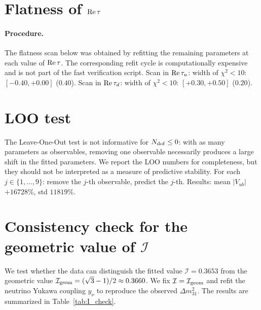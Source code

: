 \documentclass[12pt,a4paper]{article}
\numberwithin{equation}{section}
\begin{document}
\section{Flatness of \({\rm Re}\,\tau\)}
\paragraph{Procedure.}
The flatness scan below was obtained by refitting the remaining parameters at each value of \({\rm Re}\,\tau\). The corresponding refit cycle is computationally expensive and is not part of the fast verification script.
Scan in \({\rm Re}\,\tau_u\): width of \(\chi^2<10\): \([-0.40, +0.00]\) (\(0.40\)). Scan in \({\rm Re}\,\tau_d\): width of \(\chi^2<10\): \([+0.30, +0.50]\) (\(0.20\)).

\section{LOO test}
The Leave-One-Out test is not informative for \(N_{\rm dof} \le 0\): with as many parameters as observables, removing one observable necessarily produces a large shift in the fitted parameters. We report the LOO numbers for completeness, but they should not be interpreted as a measure of predictive stability. For each \(j\in\{1,\ldots,9\}\): remove the \(j\)-th observable, predict the \(j\)-th. Results: mean \(|V_{ub}|\) \(+16728\%\), std \(11819\%\).

\section{Consistency check for the geometric value of \(\mathcal I\)}
\label{app:I_check}

We test whether the data can distinguish the fitted value \(\mathcal I = 0.3653\) from the geometric value \(\mathcal I_{\rm geom} = (\sqrt{3}-1)/2 \approx 0.3660\). We fix \(\mathcal I = \mathcal I_{\rm geom}\) and refit the neutrino Yukawa coupling \(y_\nu\) to reproduce the observed \(\Delta m^2_{31}\). The results are summarized in Table~\ref{tab:I_check}.
\end{document}
